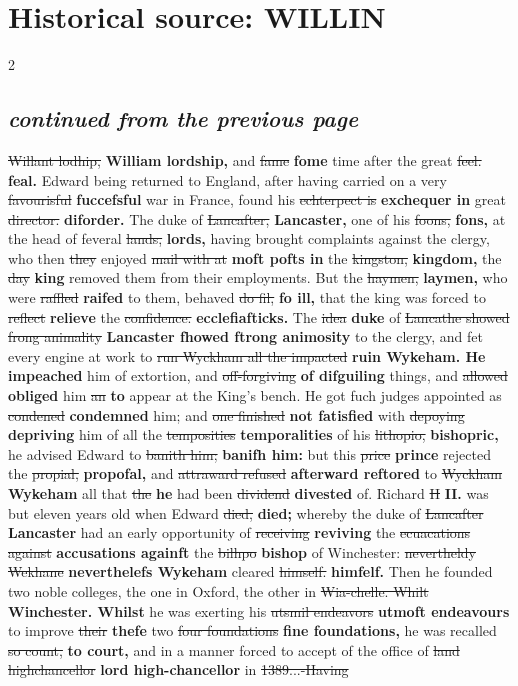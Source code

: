\documentclass[10pt]{article}
\begin{document}
\section*{Historical source: WILLIN}
\begin{multicols}{2}
\subsection*{\textit{continued from the previous page}}
\sout{Willant lodhip,} \textbf{William lordship,} and \sout{fame} \textbf{fome} time after the great \sout{feel.} \textbf{feal.} Edward being returned to England, after having carried on a very \sout{favourisful} \textbf{fuccefsful} war in France, found his \sout{echterpect is} \textbf{exchequer in} great \sout{director.} \textbf{diforder.} The duke of \sout{Lancafter,} \textbf{Lancaster,} one of his \sout{foons,} \textbf{fons,} at the head of feveral \sout{lands,} \textbf{lords,} having brought complaints against the clergy, who then \sout{they} enjoyed \sout{mail with at} \textbf{moft pofts in} the \sout{kingston,} \textbf{kingdom,} the \sout{day} \textbf{king} removed them from their employments. But the \sout{haymen,} \textbf{laymen,} who were \sout{raffled} \textbf{raifed} to them, behaved \sout{do fil,} \textbf{fo ill,} that the king was forced to \sout{reflect} \textbf{relieve} the \sout{confidence.} \textbf{ecclefiafticks.} The \sout{idea} \textbf{duke} of \sout{Lancathe showed frong animality} \textbf{Lancaster fhowed ftrong animosity} to the clergy, and fet every engine at work to \sout{run Wyckham all the impacted} \textbf{ruin Wykeham. He impeached} him of extortion, and \sout{off-forgiving} \textbf{of difguiling} things, and \sout{allowed} \textbf{obliged} him \sout{an} \textbf{to} appear at the King's bench. He got fuch judges appointed as \sout{condened} \textbf{condemned} him; and \sout{one finished} \textbf{not fatisfied} with \sout{depoying} \textbf{depriving} him of all the \sout{temposities} \textbf{temporalities} of his \sout{lithopio,} \textbf{bishopric,} he advised Edward to \sout{banith him;} \textbf{banifh him:} but this \sout{price} \textbf{prince} rejected the \sout{propial,} \textbf{propofal,} and \sout{attraward refused} \textbf{afterward reftored} to \sout{Wyckham} \textbf{Wykeham} all that \sout{the} \textbf{he} had been \sout{dividend} \textbf{divested} of. Richard \sout{II} \textbf{II.} was but eleven years old when Edward \sout{died,} \textbf{died;} whereby the duke of \sout{Lancafter} \textbf{Lancaster} had an early opportunity of \sout{receiving} \textbf{reviving} the \sout{ecuacations against} \textbf{accusations againft} the \sout{bilhpo} \textbf{bishop} of Winchester: \sout{nevertheldy Wekhane} \textbf{neverthelefs Wykeham} cleared \sout{himself.} \textbf{himfelf.} Then he founded two noble colleges, the one in Oxford, the other in \sout{Wia-chelle. Whilt} \textbf{Winchester. Whilst} he was exerting his \sout{utsmil endeavors} \textbf{utmoft endeavours} to improve \sout{their} \textbf{thefe} two \sout{four foundations} \textbf{fine foundations,} he was recalled \sout{so count,} \textbf{to court,} and in a manner forced to accept of the office of \sout{land highchancellor} \textbf{lord high-chancellor} in \sout{1389...-Having} 
\end{multicols}
\end{document}
